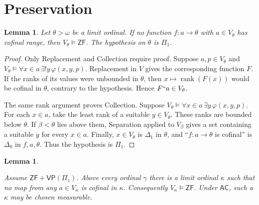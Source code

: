 \documentclass[11pt,a4paper]{amsart}
\newcommand{\VP}{\mathsf{VP}}
\newcommand{\AC}{\mathsf{AC}}
\newcommand{\ZF}{\mathsf{ZF}}
\newcommand{\rank}{\operatorname{rank}}
\theoremstyle{plain}
\newtheorem{lemma}[theorem]{Lemma}
\theoremstyle{definition}
\theoremstyle{remark}
\begin{document}
\section{Preservation}

\begin{lemma}\label{lem:ZF-rank-criterion}
Let $\theta>\omega$ be a limit ordinal.  If no function $f:a\to\theta$ with $a\in V_\theta$ has cofinal range, then $V_\theta\models\ZF$.  The hypothesis on $\theta$ is $\Pi_1$.
\end{lemma}

\begin{proof}
Only Replacement and Collection require proof.  Suppose $a,p\in V_\theta$ and $V_\theta\models\forall x\in a\,\exists!y\,\varphi(x,y,p)$.  Replacement in $V$ gives the corresponding function $F$.  If the ranks of its values were unbounded in $\theta$, then $x\mapsto\rank(F(x))$ would be cofinal in $\theta$, contrary to the hypothesis.  Hence $F``a\in V_\theta$.

The same rank argument proves Collection.  Suppose $V_\theta\models\forall x\in a\,\exists y\,\varphi(x,y,p)$.  For each $x\in a$, take the least rank of a suitable $y\in V_\theta$.  These ranks are bounded below $\theta$.  If $\beta<\theta$ lies above them, Separation applied to $V_\beta$ gives a set containing a suitable $y$ for every $x\in a$.  Finally, $x\in V_\theta$ is $\Delta_1$ in $\theta$, and ``$f:a\to\theta$ is cofinal'' is $\Delta_0$ in $f,a,\theta$.  Thus the hypothesis is $\Pi_1$.
\end{proof}

\begin{lemma}\label{lem:ZF-ranks}

{\color{auditgreen}
Assume $\ZF+\VP(\Pi_1)$.  Above every ordinal $\gamma$ there is a limit ordinal $\kappa$ such that no map from any $a\in V_\kappa$ is cofinal in $\kappa$.  Consequently $V_\kappa\models\ZF$.  Under $\AC$, such a $\kappa$ may be chosen measurable.
}
\end{lemma}
\end{document}
